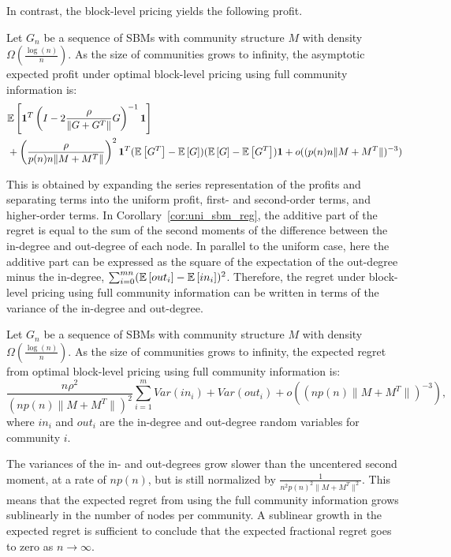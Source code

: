 In contrast, the block-level pricing yields the following profit.  
\begin{theorem}\label{thm:sbm_block}
    Let $G_n$ be a sequence of SBMs with community structure $M$ with density $\Omega(\frac{\log (n)}{n})$. As the size of communities grows to infinity, the asymptotic expected profit under optimal block-level pricing using full community information is:
        \begin{align*}
        &\mathbb{E}\left[  \mathbf{1}^T \left(I - 2\frac{\rho}{\|G+G^T\|} G \right)^{-1} \mathbf{1}\right]  \\
        &+ \left(\frac{\rho}{p(n) n \|M+M^T\|}\right)^2  \mathbf{1}^T ( \mathbb{E}\left[G^T\right]-\mathbb{E}\left[G\right])(\mathbb{E}\left[G\right]-\mathbb{E}\left[G^T\right])\mathbf{1} + o( (p(n) n \|M+M^T\|)^{-3} )
    \end{align*}
\end{theorem}

This is obtained by expanding the series representation of the profits and separating terms into the uniform profit, first- and second-order terms, and higher-order terms.  In Corollary~\ref{cor:uni_sbm_reg}, the additive part of the regret is equal to the sum of the second moments of the difference between the in-degree and out-degree of each node. In parallel to the uniform case, here the additive part can be expressed as the square of the expectation of the out-degree minus the in-degree, $\sum_{i=0}^{mn} (\mathbb{E}\left[out_i\right] - \mathbb{E}\left[in_i\right])^2$. Therefore, the regret under block-level pricing using full community information can be written in terms of the variance of the in-degree and out-degree. 
\begin{theorem}\label{prop:var_expression}
        Let $G_n$ be a sequence of SBMs with community structure $M$ with density $\Omega(\frac{\log (n)}{n})$. As the size of communities grows to infinity, the expected regret from optimal block-level pricing using full community information is:
    \begin{equation}
        \frac{ n \rho^2}{ (n p(n) \|M+M^T\|)^2 } \sum_{i =1 }^{m} Var( in_i ) + Var(out_i)   + o\left( \left(n p(n) \|M+M^T\|\right)^{-3}\right),
    \end{equation}
    where $in_i$ and $out_i$ are the in-degree and out-degree random variables for community $i$.
\end{theorem}

The variances of the in- and out-degrees grow slower than the uncentered second moment, at a rate of $n p(n)$, but is still normalized by $\frac{1}{n^2 p(n)^2 \|M+M^T\|^2 }$. This means that the expected regret from using the full community information grows sublinearly in the number of nodes per community. A sublinear growth in the expected regret is sufficient to conclude that the expected fractional regret goes to zero as $n \to \infty$. 



